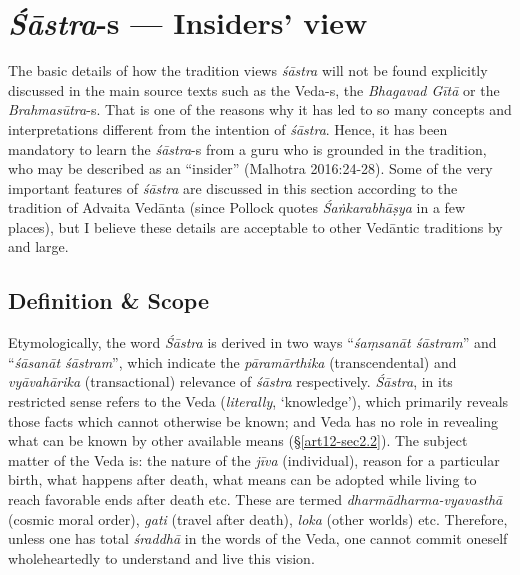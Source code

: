 \section{{{\sl\bfseries Śāstra}\relax}-s --- Insiders' view}\label{art12-sec2}

The basic details of how the tradition views {\sl śāstra} will not be found explicitly discussed in the main source texts such as the Veda-s, the {\sl Bhagavad Gītā} or the {\sl Brahmasūtra}-s. That is one of the reasons why it has led to so many concepts and interpretations different from the intention of {\sl śāstra}. Hence, it has been mandatory to learn the {\sl śāstra}-s from a guru who is grounded in the tradition, who may be described as an ``insider'' (Malhotra 2016:24-28). Some of the very important features of {\sl śāstra} are discussed in this section according to the tradition of Advaita Vedānta (since Pollock quotes {\sl Śaṅkarabhāṣya} in a few places), but I believe these details are acceptable to other Vedāntic traditions by and large.\\[-20pt]

\subsection{Definition \& Scope}\label{art12-sec2.1}

Etymologically, the word {\sl Śāstra} is derived in two ways ``{\sl śaṃsanāt śāstram}'' and ``{\sl śāsanāt śāstram}'', which indicate the {\sl pāramārthika} (transcendental) and {\sl vyāvahārika} (transactional) relevance of {\sl śāstra} respectively. {\sl Śāstra}, in its restricted sense refers to the Veda ({\sl literally}, `knowledge'), which primarily reveals those facts which cannot otherwise be known; and Veda has no role in revealing what can be known by other available means (\S\ref{art12-sec2.2}). The subject matter of the Veda is: the nature of the {\sl jīva} (individual), reason for a particular birth, what happens after death, what means can be adopted while living to reach favorable ends after death etc. These are termed {\sl dharmādharma-vyavasthā} (cosmic moral order), {\sl gati} (travel after death), {\sl loka} (other worlds) etc. Therefore, unless one has total {\sl śraddhā} in the words of the Veda, one cannot commit oneself wholeheartedly to understand and live this vision. 

